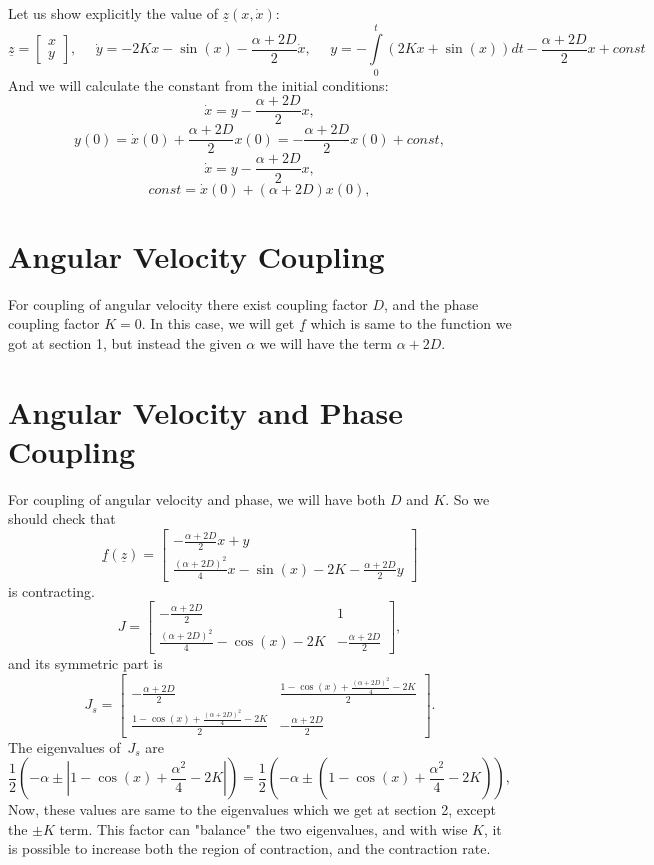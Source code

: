 \documentclass[10pt,onecolumn,twoside,letter]{IEEEtran}
\theoremstyle{plain}
\begin{document}
Let us show explicitly the value of $\underline{z}(x,\dot x)$:
\[\underline{z} =  \begin{bmatrix} x \\ y \end{bmatrix}, \ \ \ \ \ \   \dot{y}=-2K x -\sin(x) -\frac{\alpha+2D}{2}\dot{x}, \ \ \ \ \ \ y = - \int\limits_0^t
(2K x +\sin(x))dt-\frac{\alpha+2D}{2}x+const
\]
And we will calculate the constant from the initial conditions:
\[ \dot{x} = y-\frac{\alpha+2D}{2}x,
\]
\[ y(0) = \dot{x}(0)+\frac{\alpha+2D}{2}x(0) = -\frac{\alpha+2D}{2}x(0)+const,
\]
\[ \dot{x} = y-\frac{\alpha+2D}{2}x,
\]
\[ const = \dot{x}(0)+(\alpha+2D)x(0),
\]
\section{Angular Velocity Coupling}\label{sec:AngularVelocityCoupling}
For coupling of angular velocity there exist coupling factor $D$, and the phase coupling factor $K=0$. In this case, we will get $\underline{f}$ which is same to the function we got at section 1, but instead the given $\alpha$ we will have the term $\alpha+2D$.

\section{Angular Velocity and Phase Coupling}\label{sec:AngularVelocityAndPhaseCoupling}
For coupling of angular velocity and phase, we will have both $D$ and $K$. So we should check that 
\[
\underline{f}(\underline{z}) = \begin{bmatrix} -\frac{\alpha+2D}{2}x+y \\  \frac{(\alpha+2D)^2}{4}x-\sin(x)-2K-\frac{\alpha+2D}{2} y \end{bmatrix}
\]
is contracting.
\[
            J= \begin{bmatrix}   
 -\frac{\alpha+2D}{ 2} & 1 \\
 \frac{(\alpha+2D)^2}{4}-\cos(x)-2K & -\frac{\alpha+2D}{2}       
               \end{bmatrix},
\]
and its symmetric part is 
\[
            J_s= \begin{bmatrix}  -\frac{\alpha+2D}{ 2} & \frac{  1-\cos(x)+\frac{(\alpha+2D)^2}{4} -2K}{2}\\
           \frac{  1-\cos(x)+\frac{(\alpha+2D)^2}{4} -2K}{2} &-\frac{\alpha+2D}{2}
               \end{bmatrix}.
\]
The eigenvalues of~$J_s$ are
\[
             \frac{1}{2} \left(  -  {\alpha}  \pm   |  1-\cos(x)+\frac{\alpha^2}{4} -2K | \right)=\frac{1}{2} \left(  -  {\alpha}  \pm    (  1-\cos(x)+\frac{\alpha^2}{4} -2K)   \right),
\]
Now, these values are same to the eigenvalues which we get at section 2, except the $\pm K$ term. This factor can "balance" the two eigenvalues, and with wise $K$, it is possible to increase both the region of contraction, and the contraction rate. 
\end{document}
